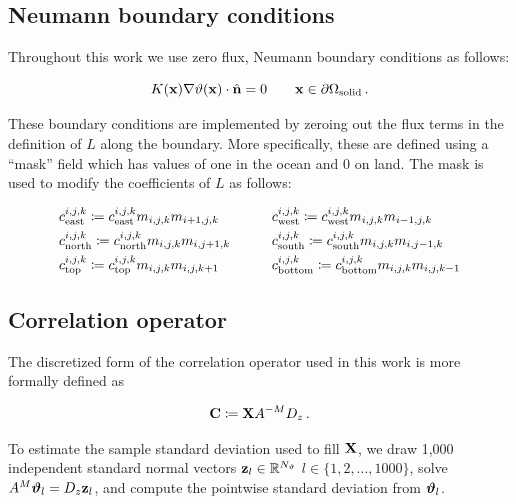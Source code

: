 \subsection{Neumann boundary conditions}
\label{ssec:boundary_conditions}

Throughout this work we use zero flux, Neumann boundary conditions as follows:
\begin{linenomath*}\begin{equation*}
    K(\mathbf{x})\nabla\vartheta(\mathbf{x}) \cdot \hat{\mathbf{n}} = 0 \qquad \mathbf{x}\in\partial\Omega_{\text{solid}} \, .
\end{equation*}\end{linenomath*}
These boundary conditions are implemented by zeroing out the flux terms in the
definition of $L$ along the boundary.
More specifically, these are defined using a ``mask'' field which has
values of one in the ocean and 0 on land.
The mask is used to modify the coefficients of $L$ as follows:
\begin{linenomath*}\begin{equation*}
    \begin{aligned}
        &c_\text{east}^{i,j,k} \coloneqq c_\text{east}^{i,j,k}
            m_{{i,j,k}} m_{{i+1,j,k}}
        \qquad
        &&c_\text{west}^{i,j,k} \coloneqq c_\text{west}^{i,j,k}
            m_{{i,j,k}} m_{{i-1,j,k}}
        \\
        &c_\text{north}^{i,j,k} \coloneqq c_\text{north}^{i,j,k}
            m_{{i,j,k}} m_{{i,j+1,k}}
        \qquad
        &&c_\text{south}^{i,j,k} \coloneqq c_\text{south}^{i,j,k}
            m_{{i,j,k}} m_{{i,j-1,k}}
        \\
        &c_\text{top}^{i,j,k} \coloneqq c_\text{top}^{i,j,k}
            m_{{i,j,k}} m_{{i,j,k+1}}
        \qquad
        &&c_\text{bottom}^{i,j,k} \coloneqq c_\text{bottom}^{i,j,k}
            m_{{i,j,k}} m_{{i,j,k-1}}
    \end{aligned}
\end{equation*}\end{linenomath*}

\subsection{Correlation operator}
\label{ssec:correlation_fv}

The discretized form of the correlation operator used in this work is more
formally defined as
\begin{linenomath*}\begin{equation}
    \mathbf{C} \coloneqq \mathbf{X} A^{-M} D_z \, .
    \label{eq:corr_operator_fv}
\end{equation}\end{linenomath*}
To estimate the sample standard deviation used to fill $\mathbf{X}$, we
draw 1,000 independent standard normal vectors $\mathbf{z}_{l} \in \mathbb{R}^{N_{\vartheta}}$
$l\in \{1, 2, ..., 1000\}$,
solve $A^{M} \bm{\vartheta}_{l} = D_z \mathbf{z}_{l}$, and
compute the pointwise standard deviation from $\bm{\vartheta}_{l}$.

